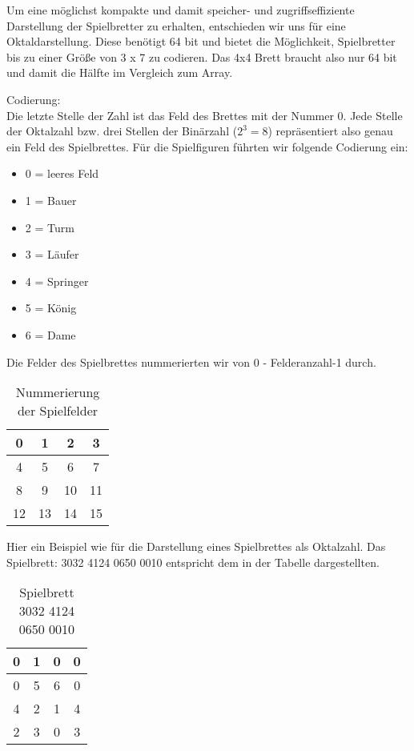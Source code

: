 \documentclass[
	12pt,
	a4paper,
	BCOR10mm,
	DIV14,
	listof=totoc,
	bibliography=totoc,
	headsepline
]{scrreprt}
\begin{document}
Um eine möglichst kompakte und damit speicher- und zugriffseffiziente Darstellung der Spielbretter zu erhalten, entschieden wir uns für eine Oktaldarstellung. Diese benötigt 64 bit und bietet die Möglichkeit, Spielbretter bis zu einer Größe von 3 x 7 zu codieren. 
Das 4x4 Brett braucht also nur 64 bit und damit die Hälfte im Vergleich zum Array.

Codierung:\\
Die letzte Stelle der Zahl ist das Feld des Brettes mit der Nummer 0.
Jede Stelle der Oktalzahl bzw. drei Stellen der Binärzahl ($ 2^3 = 8 $) repräsentiert also genau ein Feld des Spielbrettes. Für die Spielfiguren führten wir folgende Codierung ein:
\begin{itemize}
\item 0 = leeres Feld
\item 1 = Bauer
\item 2 = Turm
\item 3 = Läufer
\item 4 = Springer
\item 5 = König
\item 6 = Dame
\end{itemize}

Die Felder des Spielbrettes nummerierten wir von 0 - Felderanzahl-1 durch.
\begin{table}
	\begin{center}
		\begin{tabular}{|c|c|c|c|}\hline
		 0 &  1 &  2 &  3 \\ \hline
		 4 &  5 &  6 &  7 \\ \hline
		 8 &  9 & 10 & 11 \\ \hline
		12 & 13 & 14 & 15  \\ \hline
		\end{tabular}
	\end{center}
	\caption{Nummerierung der Spielfelder}
	\label{table:Tabelle1}
\end{table}

Hier ein Beispiel wie für die Darstellung eines Spielbrettes als Oktalzahl.
Das Spielbrett:  3032 4124 0650 0010 entspricht dem in der Tabelle dargestellten.
\begin{table}
	\begin{center}
		\begin{tabular}{|c|c|c|c|}\hline
		 0 &  1 &  0 &  0 \\ \hline
		 0 &  5 &  6 &  0 \\ \hline
		 4 &  2 &  1 & 4 \\ \hline
		 2 &  3 &  0 &  3 \\ \hline
		\end{tabular}
	\end{center}
	\caption{Spielbrett 3032 4124 0650 0010}
	\label{table:Tabelle1}
\end{table} 
\end{document}
